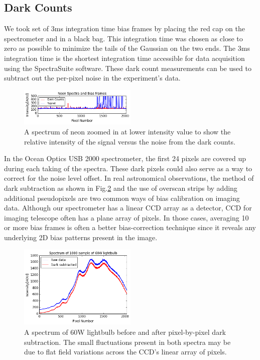 \documentclass[authoryear, 12pt,5p, times]{elsarticle}
\begin{document}
  \subsection{Dark Counts}
 We took set of 3ms integration time bias frames by placing the red cap on the spectrometer and in a black bag. This integration time was chosen as close to zero as possible to minimize the tails of the Gaussian on the two ends. The 3ms integration time is the shortest integration time accessible for data acquisition using the SpectraSuite software. These dark count measurements can be used to subtract out the per-pixel noise in the experiment's data.
 \begin{figure}[h!]
\includegraphics[width=0.5\textwidth]{figures/dark}
\caption{A spectrum of neon zoomed in at lower intensity value to show the relative intensity of the signal versus the noise from the dark counts.} 
\label{dark_neon}
\end{figure}


In the Ocean Optics USB 2000 spectrometer, the first 24 pixels are covered up during each taking of the spectra. These dark pixels could also serve as a way to correct for the noise level offset. In real astronomical observations, the method of dark subtraction as shown in Fig.\ref{60W} and the use of overscan strips by adding additional pseudopixels are two common ways of bias calibration on imaging data. Although our spectrometer has a linear CCD array as a detector, CCD for imaging telescope often has a plane array of pixels. In those cases, averaging 10 or more bias frames is often a better bias-correction technique since it reveals any underlying 2D bias patterns present in the image.
 \begin{figure}[h!]
\includegraphics[width=0.5\textwidth]{figures/60Wdarksubtracted}
\caption{A spectrum of 60W lightbulb before and after pixel-by-pixel dark subtraction. The small fluctuations present in both spectra may be due to flat field variations across the CCD's linear array of pixels.} 
\label{60W}
\end{figure}
\end{document}

